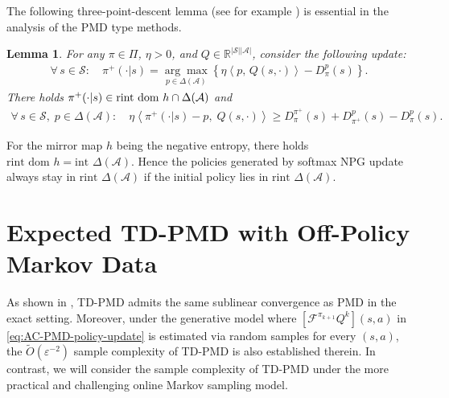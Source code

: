 \documentclass[10pt]{article}
\newcommand{\calA}{\mathcal{A}}
\newcommand{\calS}{\mathcal{S}}
\newcommand{\ls}{\left}
\newcommand{\rs}{\right}
\theoremstyle{plain}
\newtheorem{lemma}[theorem]{Lemma}
\theoremstyle{definition}
\begin{document}
 The following  three-point-descent lemma (see for example \citet{Xiao_2022,chen1993convergence}) is essential in the analysis of the PMD type methods.
\begin{lemma}
    For any $\pi \in \Pi$, $\eta > 0$, and $Q \in \mathbb{R}^{|\calS||\calA|}$, consider the following update:
    \begin{align*}
        \forall\, s\in\calS: \quad \pi^+(\cdot|s) = \underset{p\in\Delta(\calA)}{\arg\max} \ls\{ \eta  \ls\langle p, \, Q(s,\cdot) \rs\rangle - D^p_\pi(s) \rs\}.
    \end{align*}
    There holds $\pi^+(\cdot | s) \in \mbox{\textup{rint dom }}h \cap \Delta(\calA)$ and
    \begin{align*}
        \forall\, s\in\calS, \; p \in \Delta(\calA): \quad \eta \ls\langle \pi^+(\cdot|s) - p, \; Q(s,\cdot) \rs\rangle \geq D^{\pi^+}_{\pi}(s) + D^p_{\pi^+}(s) - D^p_{\pi}(s).
    \end{align*}
    \label{lem:three-point-descent-lemma}
\end{lemma}
\noindent For the mirror map $h$ being the negative entropy, there holds $\mbox{rint dom }h = \mbox{int }\Delta(\calA)$. Hence the policies generated by softmax NPG update always stay in $\mbox{rint }\Delta(\calA)$ if the initial policy lies in $\mbox{rint }\Delta(\calA)$.%

\section{Expected TD-PMD with Off-Policy Markov Data}
\label{sec:Expected-TD-AC-PMD}

As shown in \citet{liu2025tdpmd}, TD-PMD admits the same sublinear convergence as PMD in the exact setting. Moreover, under the generative model where $[\mathcal{F}^{\pi_{k+1}}Q^k](s,a)$ in \eqref{eq:AC-PMD-policy-update} is estimated via random samples for every $(s,a)$, the $\tilde{O}(\varepsilon^{-2})$ sample complexity of TD-PMD is also established therein. In contrast, we will consider the sample complexity of TD-PMD under  the more practical and challenging  online Markov sampling model.
\end{document}
